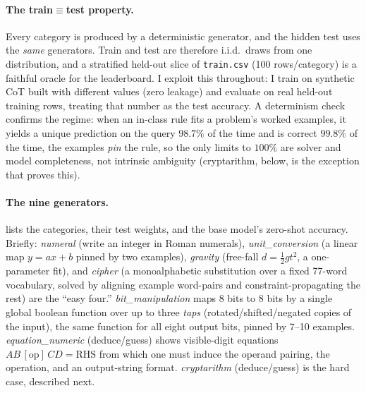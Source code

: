 \documentclass[11pt]{article}
\begin{document}
\paragraph{The train$\equiv$test property.} Every category is produced by a deterministic
generator, and the hidden test uses the \emph{same} generators. Train and test are
therefore i.i.d.\ draws from one distribution, and a stratified held-out slice of
\texttt{train.csv} (100 rows/category) is a faithful oracle for the leaderboard. I
exploit this throughout: I train on synthetic CoT built with different values
(zero leakage) and evaluate on real held-out training rows, treating that number as the
test accuracy. A determinism check confirms the regime: when an in-class rule fits a
problem's worked examples, it yields a unique prediction on the query $98.7\%$ of the time
and is correct $99.8\%$ of the time, the examples \emph{pin} the rule, so the only limits
to $100\%$ are solver and model completeness, not intrinsic ambiguity (cryptarithm, below,
is the exception that proves this).

\paragraph{The nine generators.}  lists the categories, their test weights,
and the base model's zero-shot accuracy. Briefly: \emph{numeral} (write an integer in Roman
numerals), \emph{unit\_conversion} (a linear map $y=ax+b$ pinned by two examples),
\emph{gravity} (free-fall $d=\tfrac12 g t^2$, a one-parameter fit), and \emph{cipher}
(a monoalphabetic substitution over a fixed 77-word vocabulary, solved by aligning example
word-pairs and constraint-propagating the rest) are the ``easy four.''
\emph{bit\_manipulation} maps 8 bits to 8 bits by a single global boolean function over up
to three \emph{taps} (rotated/shifted/negated copies of the input), the same function for
all eight output bits, pinned by 7--10 examples. \emph{equation\_numeric} (deduce/guess)
shows visible-digit equations $AB\,[\text{op}]\,CD = \text{RHS}$ from which one must induce
the operand pairing, the operation, and an output-string format. \emph{cryptarithm}
(deduce/guess) is the hard case, described next.
\end{document}
